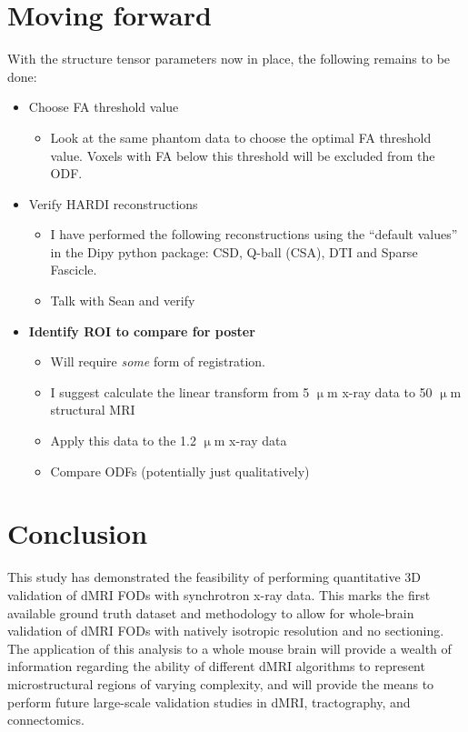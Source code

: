 \documentclass[11pt]{article}
\begin{document}
\section{Moving forward}
With the structure tensor parameters now in place, the following remains to be done:
\begin{itemize}
\item Choose FA threshold value
  \begin{itemize}
  \item Look at the same phantom data to choose the optimal FA threshold value. Voxels
    with FA below this threshold will be excluded from the ODF. 
  \end{itemize}
  \newpage
\item Verify HARDI reconstructions
  \begin{itemize}
  \item I have performed the following reconstructions using the ``default
    values'' in the Dipy python package: CSD, Q-ball (CSA), DTI and Sparse
    Fascicle.
  \item Talk with Sean and verify
  \end{itemize}
\item \textbf{Identify ROI to compare for poster}
  \begin{itemize}
  \item Will require \textit{some} form of registration.
  \item I suggest calculate the linear transform from 5 $\upmu$m x-ray data to 50 $\upmu$m structural MRI
  \item Apply this data to the 1.2 $\upmu$m x-ray data
  \item Compare ODFs (potentially just qualitatively) 
  \end{itemize}
\end{itemize}


\section{Conclusion}
This study has demonstrated the feasibility of performing quantitative 3D
validation of dMRI FODs with synchrotron x-ray data. This marks the first
available ground truth dataset and methodology to allow for whole-brain
validation of dMRI FODs with natively isotropic resolution and no sectioning. The
application of this analysis to a whole mouse brain will provide a wealth of
information regarding the ability of different dMRI algorithms to represent
microstructural regions of varying complexity, and will provide the means to
perform future large-scale validation studies in dMRI, tractography, and
connectomics.




\end{document}
